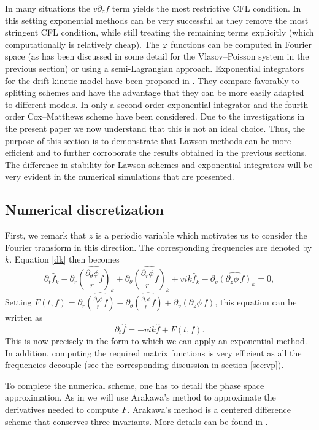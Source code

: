 In many situations the $v \partial_z f$ term yields the most restrictive CFL condition. In this setting exponential methods can be very successful as they remove the most stringent CFL condition, while still treating the remaining terms explicitly (which computationally is relatively cheap). The $\varphi$ functions can be computed in Fourier space (as has been discussed in some detail for the Vlasov--Poisson system in the previous section) or using a semi-Lagrangian approach. Exponential integrators for the drift-kinetic model have been proposed in \cite{cep}. They compare favorably to splitting schemes and have the advantage that they can be more easily adapted to different models. In \cite{cep} only a second order exponential integrator and the fourth order Cox--Matthews scheme have been considered. Due to the investigations in the present paper we now understand that this is not an ideal choice. Thus, the purpose of this section is to demonstrate that Lawson methods can be more efficient and to further corroborate the results obtained in the previous sections. The difference in stability for Lawson schemes and exponential integrators will be very evident in the numerical simulations that are presented.

\subsection{Numerical discretization}

First, we remark that $z$ is a periodic variable which motivates us to consider the Fourier transform in this direction. The corresponding frequencies are denoted by $k$. Equation \eqref{dk} then becomes
$$
\partial_t \hat{f}_k -\partial_r \widehat{\left(\frac{\partial_\theta \phi}{r}f\right)}_k+\partial_\theta \widehat{\left(\frac{\partial_r \phi}{r} f\right)}_k +vik \hat{f}_k-\partial_v\widehat{\left( \partial_z\phi \, f\right)}_k=0, 
$$
Setting $F(t, f)= \partial_r \widehat{\left(\frac{\partial_\theta \phi}{r}f\right)}-\partial_\theta \widehat{\left(\frac{\partial_r \phi}{r} f\right)} +\partial_v\widehat{\left( \partial_z\phi \,f\right)}$, this equation can be written as
$$
\partial_t \hat{f} = - vik \hat{f} + F(t, f). 
$$
This is now precisely in the form to which we can apply an exponential method. In addition, computing the required matrix functions is very efficient as all the frequencies decouple (see the corresponding discussion in section \ref{sec:vp}).

To complete the numerical scheme, one has to detail the phase space approximation. As in \cite{cep} we will use Arakawa's method to approximate the derivatives needed to compute $F$. Arakawa's method is a centered difference scheme that conserves three invariants. More details can be found in \cite{cep}.



